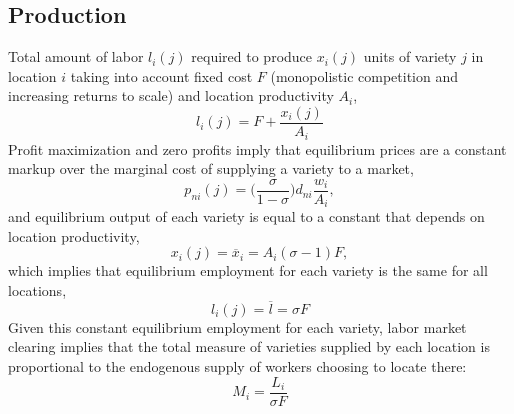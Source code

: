 \documentclass[11pt]{article}
\begin{document}
\subsection*{Production}
Total amount of labor $l_{i}(j)$ required to produce $x_{i}(j)$ units of variety $j$ in location $i$ taking into account fixed cost $F$ (monopolistic competition and increasing returns to scale) and location productivity $A_{i}$,
\begin{equation}
l_{i}(j) = F + \frac{x_{i}(j)}{A_{i}}
\end{equation}
Profit maximization and zero profits imply that equilibrium prices are a constant markup over the marginal cost of supplying a variety to a market,
\begin{equation} \label{equi_prices}
p_{ni}(j) = \Big( \frac{\sigma}{1 - \sigma} \Big) d_{ni} \frac{w_{i}}{A_{i}},
\end{equation}
and equilibrium output of each variety is equal to a constant that depends on location productivity,
\begin{equation}
x_{i}(j) = \overline{x}_{i} = A_{i}(\sigma - 1 ) F,
\end{equation}
which implies that equilibrium employment for each variety is the same for all locations,
\begin{equation}
l_{i}(j) = \overline{l} = \sigma F
\end{equation}
Given this constant equilibrium employment for each variety, labor market clearing implies that the total measure of varieties supplied by each location is proportional to the endogenous supply of workers choosing to locate there:
\begin{equation} \label{LM_clearing}
M_{i} = \frac{L_{i}}{\sigma F}
\end{equation}
\end{document}
